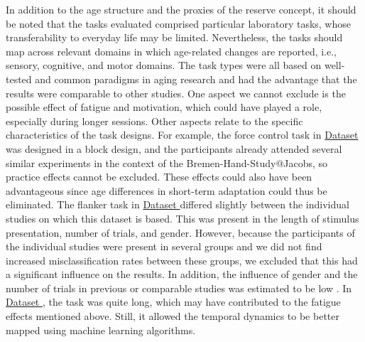 In addition to the age structure and the proxies of the reserve concept, it should be noted that the tasks evaluated comprised particular laboratory tasks, whose transferability to everyday life may be limited. Nevertheless, the tasks should map across relevant domains in which age-related changes are reported, i.e., sensory, cognitive, and motor domains. The task types were all based on well-tested and common paradigms in aging research and had the advantage that the results were comparable to other studies. One aspect we cannot exclude is the possible effect of fatigue and motivation, which could have played a role, especially during longer sessions. Other aspects relate to the specific characteristics of the task designs. For example, the force control task in \hyperref[methods:datasets:I]{Dataset } was designed in a block design, and the participants already attended several similar experiments in the context of the Bremen-Hand-Study@Jacobs, so practice effects cannot be excluded. These effects could also have been advantageous since age differences in short-term adaptation could thus be eliminated. The flanker task in \hyperref[methods:datasets:II]{Dataset } differed slightly between the individual studies on which this dataset is based. This was present in the length of stimulus presentation, number of trials, and gender. However, because the participants of the individual studies were present in several groups and we did not find increased misclassification rates between these groups, we excluded that this had a significant influence on the results. In addition, the influence of gender and the number of trials in previous or comparable studies was estimated to be low \cite{Reuter2019, Vahid2020}. In \hyperref[methods:datasets:III]{Dataset }, the task was quite long, which may have contributed to the fatigue effects mentioned above. Still, it allowed the temporal dynamics to be better mapped using machine learning algorithms.

